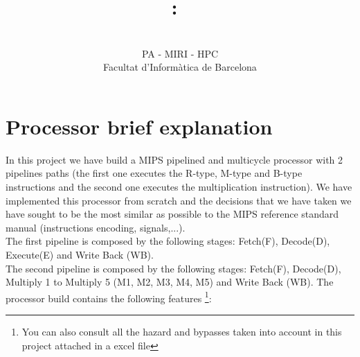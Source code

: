 \documentclass{article}
\title{
\vspace{1in}
\textmd{\textbf{\hmwkClass:\ \vspace{0.5in\huge\hmwkTitle}}}\\
\vspace{4.5in}
}
\author{\textbf{\hmwkAuthorName}\vspace{0in}\\
	PA - MIRI - HPC\\
	Facultat d'Informàtica de Barcelona}
\date{\vspace{0.2in}\normalsize\small{\hmwkDueDate}} %
\begin{document}
\maketitle



\newpage
\tableofcontents
\listoffigures
\newpage
	
\section{Processor brief explanation}
In this project we have build a MIPS pipelined and multicycle processor with 2 pipelines paths (the first one executes the R-type, M-type and B-type instructions and the second one executes the multiplication instruction). We have implemented this processor from scratch and the decisions that we have taken we have sought to be the most similar as possible to the MIPS reference standard manual (instructions encoding, signals,...).\\

The first pipeline is composed by the following stages: Fetch(F), Decode(D), Execute(E) and Write Back (WB).\\

The second pipeline is composed by the following stages: Fetch(F), Decode(D), Multiply 1 to Multiply 5 (M1, M2, M3, M4, M5) and Write Back (WB).
The processor build contains the following features \footnote{You can also consult all the hazard and bypasses taken into account in this project attached in a excel file}:
\end{document}
